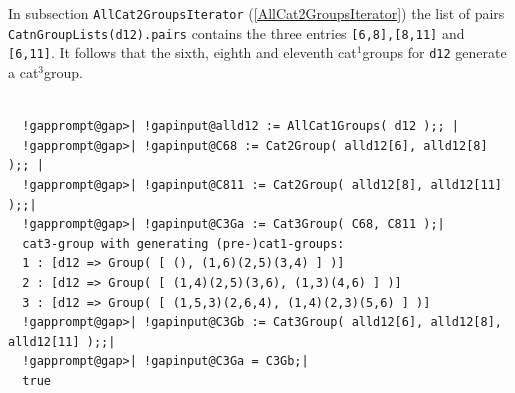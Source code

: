 \documentclass[a4paper,11pt]{report}
\begin{document}
{{{ In subsection \texttt{AllCat2GroupsIterator} (\ref{AllCat2GroupsIterator}) the list of pairs \texttt{CatnGroupLists(d12).pairs} contains the three entries \texttt{[6,8],[8,11]} and \texttt{[6,11]}. It follows that the sixth, eighth and eleventh cat$^1$\texttt{}groups for \texttt{d12} generate a cat$^3$\texttt{}group. }

 

 
\begin{Verbatim}[commandchars=!@|,fontsize=\small,frame=single,label=Example]
  
  !gapprompt@gap>| !gapinput@alld12 := AllCat1Groups( d12 );; |
  !gapprompt@gap>| !gapinput@C68 := Cat2Group( alld12[6], alld12[8] );; |
  !gapprompt@gap>| !gapinput@C811 := Cat2Group( alld12[8], alld12[11] );;|
  !gapprompt@gap>| !gapinput@C3Ga := Cat3Group( C68, C811 );|
  cat3-group with generating (pre-)cat1-groups:
  1 : [d12 => Group( [ (), (1,6)(2,5)(3,4) ] )]
  2 : [d12 => Group( [ (1,4)(2,5)(3,6), (1,3)(4,6) ] )]
  3 : [d12 => Group( [ (1,5,3)(2,6,4), (1,4)(2,3)(5,6) ] )]
  !gapprompt@gap>| !gapinput@C3Gb := Cat3Group( alld12[6], alld12[8], alld12[11] );;|
  !gapprompt@gap>| !gapinput@C3Ga = C3Gb;|
  true
  
\end{Verbatim}
 

}}
\end{document}
